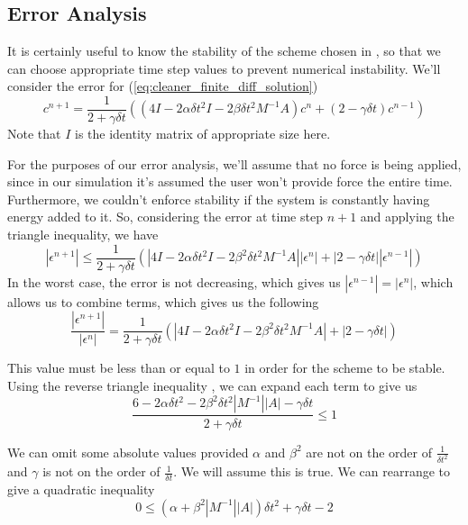 \subsection{Error Analysis}
It is certainly useful to know the stability of the scheme chosen in \label{eq:finite_diff_solution}, so that we can
choose appropriate time step values to prevent numerical instability. We'll consider the error for 
(\ref{eq:cleaner_finite_diff_solution})
\begin{equation}
c^{n+1} = 
\frac{1}{2 + \gamma\delta t}
\left(
    \left( 4I - 2\alpha\delta t^2I - 2\beta\delta t^2M^{-1}A \right) c^n
    +
    \left( 2 - \gamma\delta t \right) c^{n-1}
\right)
\end{equation}
Note that $I$ is the identity matrix of appropriate size here.

For the purposes of our error analysis, we'll assume that no force is being applied, since in our simulation it's
assumed the user won't provide force the entire time. Furthermore, we couldn't enforce stability if the system is
constantly having energy added to it. So, considering the error at time step $n+1$ and applying the triangle
inequality, we have
\begin{equation}
|\epsilon^{n+1}|
\le
\frac{1}{2 + \gamma\delta t}
\left(
    |4I - 2\alpha\delta t^2I - 2\beta^2\delta t^2M^{-1}A| |\epsilon^n|
    +
    |2 - \gamma\delta t| |\epsilon^{n-1}| 
\right)
\end{equation}
In the worst case, the error is not decreasing, which gives us $|\epsilon^{n-1}| = |\epsilon^n|$, which allows us to
combine terms, which gives us the following
\begin{equation}
\frac{|\epsilon^{n+1}|}{|\epsilon^n|}
=
\frac{1}{2 + \gamma\delta t} \left(
|4I - 2\alpha\delta t^2I - 2\beta^2\delta t^2M^{-1}A| + |2 - \gamma\delta t|
\right)
\end{equation}

This value must be less than or equal to $1$ in order for the scheme to be stable. Using the reverse triangle
inequality \cite{reverse_triangle_inequality}, we can expand each term to give us
\begin{equation}
\frac{6 - 2\alpha\delta t^2 - 2\beta^2 \delta t^2 |M^{-1}| |A| - \gamma\delta t}{2 + \gamma\delta t} \le 1
\end{equation}

We can omit some absolute values provided $\alpha$ and $\beta^2$ are not on the order of $\frac{1}{\delta t^2}$ and
$\gamma$ is not on the order of $\frac{1}{\delta t}$. We will assume this is true. We can rearrange to give a
quadratic inequality
\begin{equation}
0 \le \left(\alpha + \beta^2|M^{-1}| |A|\right)\delta t^2 + \gamma\delta t - 2
\end{equation}

